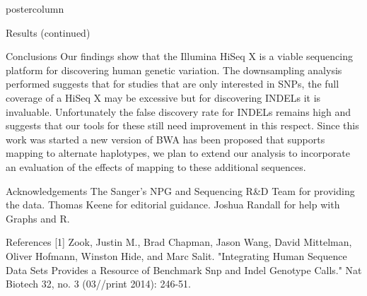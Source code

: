 \documentclass[final,xcolor=table]{beamer}
\begin{document}
\begin{frame}{}
\begin{columns}
\begin{column}{.49\textwidth}
\begin{beamercolorbox}[center,wd=\textwidth]{postercolumn}
\begin{minipage}[T]{.95\textwidth}
\begin{block}{Results (continued)}
            \end{block}
            \begin{block}{Conclusions}
                Our findings show that the Illumina HiSeq X is a viable sequencing platform for discovering human genetic variation.  The downsampling analysis performed suggests that for studies that are only interested in SNPs, the full coverage of a HiSeq X may be excessive but for discovering INDELs it is invaluable. Unfortunately the false discovery rate for INDELs remains high and suggests that our tools for these still need improvement in this respect. Since this work was started a new version of BWA has been proposed that supports mapping to alternate haplotypes, we plan to extend our analysis to incorporate an evaluation of the effects of mapping to these additional sequences.
            \end{block}
            \begin{block}{Acknowledgements}
                The Sanger's NPG and Sequencing R\&D Team for providing the data. Thomas Keene for editorial guidance. Joshua Randall for help with Graphs and R.
            \end{block}
            \begin{block}{References}
                [1] Zook, Justin M., Brad Chapman, Jason Wang, David Mittelman, Oliver Hofmann, Winston Hide, and Marc Salit. "Integrating Human Sequence Data Sets Provides a Resource of Benchmark Snp and Indel Genotype Calls." Nat Biotech 32, no. 3 (03//print 2014): 246-51.
            \end{block}
            \vfill


            \end{minipage}
        \end{beamercolorbox}
    \end{column}
    \end{columns}

\end{frame}
\end{document}
